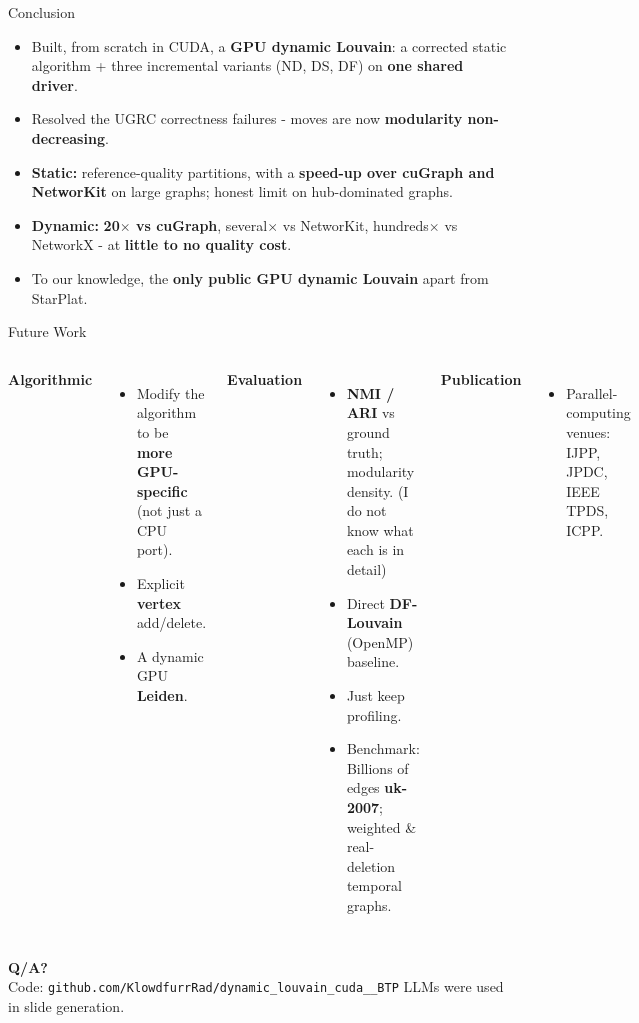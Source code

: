\documentclass[aspectratio=169]{beamer}
\begin{document}
\begin{frame}{Conclusion}
    \begin{itemize}
        \item Built, from scratch in CUDA, a \textbf{GPU dynamic Louvain}: a corrected static
        algorithm + three incremental variants (ND, DS, DF) on \textbf{one shared driver}.
        \item Resolved the UGRC correctness failures - moves are now \textbf{modularity
        non-decreasing}.
        \item \textbf{Static:} reference-quality partitions, with a \textbf{speed-up over
        cuGraph and NetworKit} on large graphs; honest limit on hub-dominated graphs.
        \item \textbf{Dynamic:} \textbf{20$\times$ vs cuGraph}, several$\times$ vs NetworKit,
        hundreds$\times$ vs NetworkX - at \textbf{little to no quality cost}.
        \item To our knowledge, the \textbf{only public GPU dynamic Louvain} apart from
        StarPlat.
    \end{itemize}
\end{frame}

\begin{frame}{Future Work}
    \begin{columns}
        \textbf{Algorithmic}
        \begin{itemize}\small
            \item Modify the algorithm to be \textbf{more GPU-specific} (not just a CPU port).
            \item Explicit \textbf{vertex} add/delete.
            \item A dynamic GPU \textbf{Leiden}.
        \end{itemize}
        \textbf{Evaluation}
        \begin{itemize}\small
            \item \textbf{NMI / ARI} vs ground truth; modularity density. (I do not know what each is in detail)
            \item Direct \textbf{DF-Louvain} (OpenMP) baseline.
            \item Just keep profiling.
            \item Benchmark: Billions of edges \textbf{uk-2007}; weighted \& real-deletion temporal graphs.
        \end{itemize}
        \vspace{0.3em}
        \textbf{Publication}
        \begin{itemize}\small
            \item Parallel-computing venues: IJPP, JPDC, IEEE TPDS, ICPP.
        \end{itemize}
    \end{columns}
\end{frame}

\begin{frame}
    \centering
    \vfill
    {\Huge \textbf{Q/A?}}\\[1.5em]
    {\small Code: \texttt{github.com/KlowdfurrRad/dynamic\_louvain\_cuda\_\_BTP}}
    \vfill
    {\tiny LLMs were used in slide generation.}
\end{frame}
\end{document}
